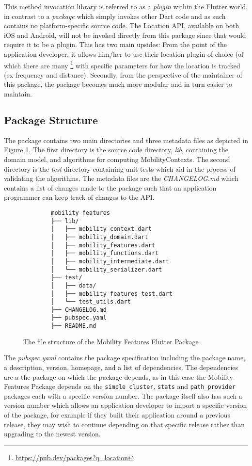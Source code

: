 This method invocation library is referred to as a \textit{plugin} within the Flutter world, in contrast to a \textit{package} which simply invokes other Dart code and as such contains no platform-specific source code.  The Location API, available on both iOS and Android, will not be invoked directly from this package since that would require it to be a plugin. This has two main upsides: From the point of the application developer, it allows him/her to use their location plugin of choice (of which there are many \footnote{\url{https://pub.dev/packages?q=location}} with specific parameters for how the location is tracked (ex frequency and distance). Secondly, from the perspective of the maintainer of this package, the package becomes much more modular and in turn easier to maintain.

\subsection{Package Structure}
The package contains two main directories and three metadata files as depicted in Figure \ref{fig:package-structure}. The first directory is the source code directory, \textit{lib}, containing the domain model, and algorithms for computing MobilityContexts. The second directory is the \textit{test} directory containing unit tests which aid in the process of validating the algorithms. The metadata files are the \textit{CHANGELOG.md} which contains a list of changes made to the package such that an application programmer can keep track of changes to the API. 

\begin{figure}
    \centering
    \begin{verbatim}
        mobility_features
        ├── lib/
        │   ├── mobility_context.dart
        │   ├── mobility_domain.dart
        │   ├── mobility_features.dart
        │   ├── mobility_functions.dart
        │   ├── mobility_intermediate.dart
        │   └── mobility_serializer.dart
        ├── test/
        │   ├── data/
        │   ├── mobility_features_test.dart
        │   └── test_utils.dart
        ├── CHANGELOG.md
        ├── pubspec.yaml
        ├── README.md
    \end{verbatim}
    \caption{The file structure of the Mobility Features Flutter Package}
    \label{fig:package-structure}
\end{figure}

The \textit{pubspec.yaml} contains the package specification including the package name, a description, version, homepage, and a list of dependencies. The dependencies are a the package on which the package depends, as in this case the Mobility Features Package depends on the \verb|simple_cluster|, \verb|stats| and \verb|path_provider| packages each with a specific version number. The package itself also has such a version number which allows an application developer to import a specific version of the package, for example if they built their application around a previous release, they may wish to continue depending on that specific release rather than upgrading to the newest version.

